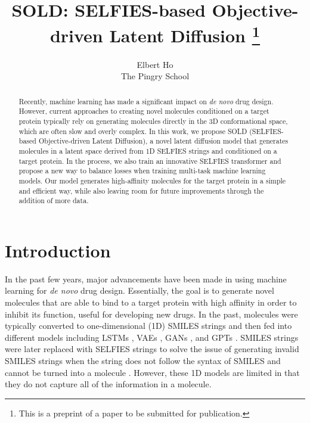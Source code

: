 \documentclass[11pt]{article}
\title{SOLD: SELFIES-based Objective-driven Latent Diffusion \footnote{This is a preprint of a paper to be submitted for publication.}}
\author{Elbert Ho \\ The Pingry School}
\date{}
\begin{document}
\linespread{1.5}
\maketitle

\begin{abstract}
    Recently, machine learning has made a significant impact on 
    \textit{de novo} drug design. However, current approaches to creating 
    novel molecules conditioned on a target protein typically rely on generating 
    molecules directly in the 3D conformational space, which are often slow and overly complex.
    In this work, we propose SOLD (SELFIES-based Objective-driven Latent Diffusion), a novel 
    latent diffusion model that generates molecules in a latent space 
    derived from 1D SELFIES strings and conditioned on a target protein. In the 
    process, we also train an innovative SELFIES transformer and propose a new way to 
    balance losses when training multi-task machine learning models.
    Our model generates high-affinity molecules for the target protein 
    in a simple and efficient way, while also leaving room for 
    future improvements through the addition of more data. 
\end{abstract}

\section{Introduction}

In the past few years, major advancements have been made in
using machine learning for
\textit{de novo} drug design. Essentially, the goal is to generate novel 
molecules that are able to bind to a target protein with high affinity in order 
to inhibit its function, useful for developing new drugs. 
In the past, molecules were 
typically converted to one-dimensional (1D) SMILES strings and then fed into 
different models including LSTMs \cite{ERTL17}, VAEs \cite{Bombarelli16}, 
GANs \cite{Guimaraes18}, and GPTs \cite{Li23}. 
SMILES strings were later replaced with SELFIES strings to solve
the issue of generating invalid SMILES strings when the string does not follow the syntax of 
SMILES and cannot be turned into a molecule \cite{Krenn19}.
However, these 1D models are limited 
in that they do not capture all of the information in a molecule. 
\end{document}
